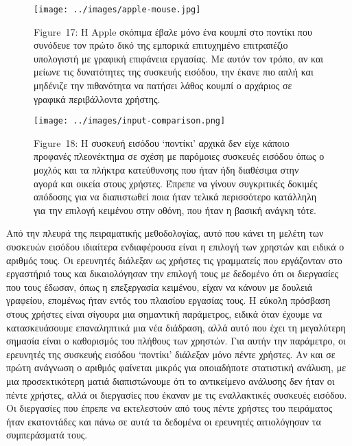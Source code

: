 \documentclass[
]{article}
\begin{document}
\leavevmode{}%
\begin{figure}
\hypertarget{fig:apple-mouse}{%
\centering
\texttt{[image: ../images/apple-mouse.jpg]}
\caption{Figure~17: Η Apple σκόπιμα έβαλε μόνο ένα κουμπί στο ποντίκι
που συνόδευε τον πρώτο δικό της εμπορικά επιτυχημένο επιτραπέζιο
υπολογιστή με γραφική επιφάνεια εργασίας. Με αυτόν τον τρόπο, αν και
μείωνε τις δυνατότητες της συσκευής εισόδου, την έκανε πιο απλή και
μηδένιζε την πιθανότητα να πατήσει λάθος κουμπί ο αρχάριος σε γραφικά
περιβάλλοντα χρήστης.}\label{fig:apple-mouse}
}
\end{figure}

\leavevmode{}%
\begin{figure}
\hypertarget{fig:input-comparison}{%
\centering
\texttt{[image: ../images/input-comparison.png]}
\caption{Figure~18: Η συσκευή εισόδου `ποντίκι' αρχικά δεν είχε κάποιο
προφανές πλεονέκτημα σε σχέση με παρόμοιες συσκευές εισόδου όπως ο
μοχλός και τα πλήκτρα κατεύθυνσης που ήταν ήδη διαθέσιμα στην αγορά και
οικεία στους χρήστες. Έπρεπε να γίνουν συγκριτικές δοκιμές απόδοσης για
να διαπιστωθεί ποια ήταν τελικά περισσότερο κατάλληλη για την επιλογή
κειμένου στην οθόνη, που ήταν η βασική ανάγκη
τότε.}\label{fig:input-comparison}
}
\end{figure}

Από την πλευρά της πειραματικής μεθοδολογίας, αυτό που κάνει τη μελέτη
των συσκευών εισόδου ιδιαίτερα ενδιαφέρουσα είναι η επιλογή των χρηστών
και ειδικά ο αριθμός τους. Οι ερευνητές διάλεξαν ως χρήστες τις
γραμματείς που εργάζονταν στο εργαστήριό τους και δικαιολόγησαν την
επιλογή τους με δεδομένο ότι οι διεργασίες που τους έδωσαν, όπως η
επεξεργασία κειμένου, είχαν να κάνουν με δουλειά γραφείου, επομένως ήταν
εντός του πλαισίου εργασίας τους. Η εύκολη πρόσβαση στους χρήστες είναι
σίγουρα μια σημαντική παράμετρος, ειδικά όταν έχουμε να κατασκευάσουμε
επαναληπτικά μια νέα διάδραση, αλλά αυτό που έχει τη μεγαλύτερη σημασία
είναι ο καθορισμός του πλήθους των χρηστών. Για αυτήν την παράμετρο, οι
ερευνητές της συσκευής εισόδου `ποντίκι' διάλεξαν μόνο πέντε χρήστες. Αν
και σε πρώτη ανάγνωση ο αριθμός φαίνεται μικρός για οποιαδήποτε
στατιστική ανάλυση, με μια προσεκτικότερη ματιά διαπιστώνουμε ότι το
αντικείμενο ανάλυσης δεν ήταν οι πέντε χρήστες, αλλά οι διεργασίες που
έκαναν με τις εναλλακτικές συσκευές εισόδου. Οι διεργασίες που έπρεπε να
εκτελεστούν από τους πέντε χρήστες του πειράματος ήταν εκατοντάδες και
πάνω σε αυτά τα δεδομένα οι ερευνητές αιτιολόγησαν τα συμπεράσματά τους.
\end{document}
